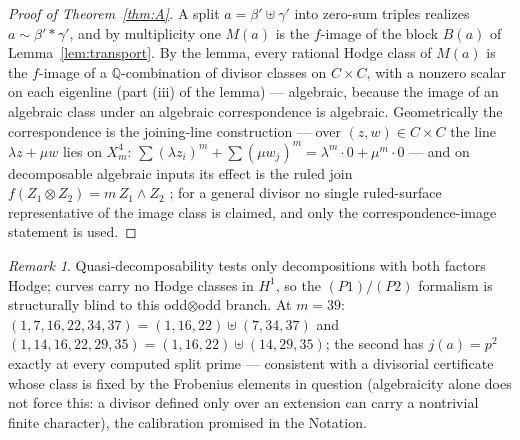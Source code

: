 \documentclass[11pt]{amsart}
\theoremstyle{remark}
\newtheorem{remark}[theorem]{Remark}
\newcommand{\Q}{\mathbb{Q}}
\begin{document}
\begin{proof}[Proof of Theorem~\ref{thm:A}]
A split $a=\beta'\uplus\gamma'$ into zero-sum triples realizes $a\sim\beta'*\gamma'$, and by
multiplicity one $M(a)$ is the $f$-image of the block $B(a)$ of Lemma~\ref{lem:transport}. By the
lemma, every rational Hodge class of $M(a)$ is the $f$-image of a $\Q$-combination of divisor
classes on $C\times C$, with a nonzero scalar on each eigenline (part (iii) of the lemma) ---
algebraic, because the image of an algebraic class under an algebraic correspondence is
algebraic. Geometrically the correspondence is the joining-line construction --- over
$(z,w)\in C\times C$ the line $\lambda z+\mu w$ lies on $X^4_m$:
$\sum(\lambda z_i)^m+\sum(\mu w_j)^m=\lambda^m\cdot0+\mu^m\cdot0$ --- and on decomposable
algebraic inputs its effect is the ruled join $f(Z_1\otimes Z_2)=m\,Z_1\wedge Z_2$
\cite[Thm.~2.2(c)]{daSilva}; for a general divisor no single ruled-surface representative of
the image class is claimed, and only the correspondence-image statement is used.
\end{proof}
\begin{remark}
Quasi-decomposability tests only decompositions with both factors Hodge; curves carry no Hodge classes in
$H^1$, so the $(P1)/(P2)$ formalism is structurally blind to this odd$\otimes$odd branch. At $m=39$:
$(1,7,16,22,34,37)=(1,16,22)\uplus(7,34,37)$ and $(1,14,16,22,29,35)=(1,16,22)\uplus(14,29,35)$; the
second has $j(a)=p^2$ exactly at every computed split prime --- consistent with a divisorial
certificate whose class is fixed by the Frobenius elements in question (algebraicity alone does
not force this: a divisor defined only over an extension can carry a nontrivial finite
character), the calibration promised in the Notation.
\end{remark}
\end{document}
